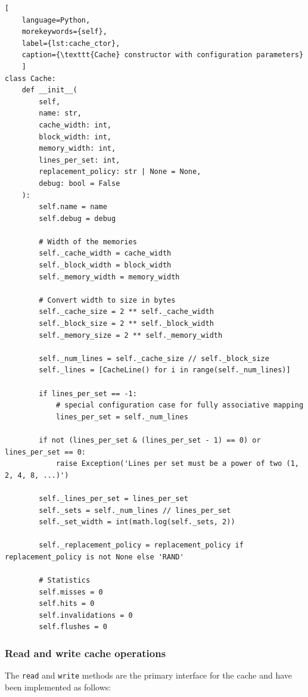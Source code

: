 \begin{center}
\centering
\begin{minipage}{\linewidth}
\begin{lstlisting}[
    language=Python,
	morekeywords={self},
    label={lst:cache_ctor},
    caption={\texttt{Cache} constructor with configuration parameters}
    ]
class Cache:
    def __init__(
        self,
        name: str,
        cache_width: int,
        block_width: int,
        memory_width: int,
        lines_per_set: int,
        replacement_policy: str | None = None,
        debug: bool = False
    ):
        self.name = name
        self.debug = debug

        # Width of the memories
        self._cache_width = cache_width
        self._block_width = block_width
        self._memory_width = memory_width

        # Convert width to size in bytes
        self._cache_size = 2 ** self._cache_width
        self._block_size = 2 ** self._block_width
        self._memory_size = 2 ** self._memory_width

        self._num_lines = self._cache_size // self._block_size
        self._lines = [CacheLine() for i in range(self._num_lines)]

        if lines_per_set == -1:
            # special configuration case for fully associative mapping
            lines_per_set = self._num_lines

        if not (lines_per_set & (lines_per_set - 1) == 0) or lines_per_set == 0:
            raise Exception('Lines per set must be a power of two (1, 2, 4, 8, ...)')

        self._lines_per_set = lines_per_set
        self._sets = self._num_lines // lines_per_set
        self._set_width = int(math.log(self._sets, 2))

        self._replacement_policy = replacement_policy if replacement_policy is not None else 'RAND'

        # Statistics
        self.misses = 0
        self.hits = 0
        self.invalidations = 0
        self.flushes = 0
\end{lstlisting}
\end{minipage}
\end{center}

\subsubsection*{Read and write cache operations}
\noindent The \texttt{read} and \texttt{write} methods are the primary interface for the cache and have been implemented as follows:

